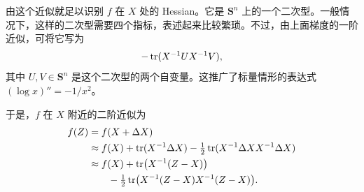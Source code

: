 由这个近似就足以识别 $f$ 在 $X$ 处的 Hessian。它是 $\mathbf S^n$ 上的一个二次型。一般情况下，这样的二次型需要四个指标，表述起来比较繁琐。不过，由上面梯度的一阶近似，可将它写为
\[
 -\operatorname{tr}(X^{-1}UX^{-1}V),
\]
其中 $U,V\in\mathbf S^n$ 是这个二次型的两个自变量。这推广了标量情形的表达式 $(\log x)''=-1/x^2$。

于是，$f$ 在 $X$ 附近的二阶近似为
\begin{align*}
 f(Z)&=f(X+\Delta X)\\
 &\approx f(X)+\operatorname{tr}(X^{-1}\Delta X)-\tfrac12\operatorname{tr}(X^{-1}\Delta XX^{-1}\Delta X)\\
 &\approx f(X)+\operatorname{tr}\bigl(X^{-1}(Z-X)\bigr)\\
 &\qquad-\tfrac12\operatorname{tr}\bigl(X^{-1}(Z-X)X^{-1}(Z-X)\bigr).
\end{align*}
